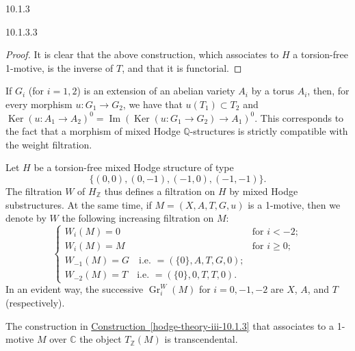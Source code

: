 \begin{construction}{10.1.3}
\begin{lemma}{10.1.3.3}
\begin{proof}
  \par{}It is clear that the above construction, which associates to \(H\) a torsion-free 1-motive, is the inverse of \(T\), and that it is functorial.\end{proof}\end{lemma}\par{}If \(G_i\) (for \(i=1,2\)) is an extension of an abelian variety \(A_i\) by a torus \(A_i\), then, for every morphism \(u\colon  G_1\to  G_2\), we have that \(u(T_1)\subset  T_2\) and \(\operatorname {Ker}(u\colon  A_1\to  A_2)^0=\operatorname {Im}(\operatorname {Ker}(u\colon  G_1\to  G_2)\to  A_1)^0\).
    This corresponds to the fact that a morphism of mixed Hodge \(\mathbb {Q}\)-structures is strictly compatible with the weight filtration.\end{construction}\label{hodge-theory-iii-10.1.4}\par{}Let \(H\) be a torsion-free mixed Hodge structure of type
    \[       \big \{(0,0),(0,-1),(-1,0),(-1,-1)\big \}.     \]
    The filtration \(W\) of \(H_\mathbb {Z}\) thus defines a filtration on \(H\) by mixed Hodge substructures.
    At the same time, if \(M=(X,A,T,G,u)\) is a 1-motive, then we denote by \(W\) the following increasing filtration on \(M\):
    \[       \begin {cases}         W_i(M) = 0         & \text {for }i< -2;       \\W_i(M) = M         & \text {for }i\geqslant 0;       \\W_{-1}(M) = G         \quad \text {i.e. } = (\{0\},A,T,G,0);       \\W_{-2}(M) = T         \quad \text {i.e. } = (\{0\},0,T,T,0).       \end {cases}     \]
    In an evident way, the successive \(\operatorname {Gr}_i^W(M)\) for \(i=0,-1,-2\) are \(X\), \(A\), and \(T\) (respectively).\label{hodge-theory-iii-10.1.5}\par{}The construction in \hyperref[hodge-theory-iii-10.1.3]{Construction~\ref*{hodge-theory-iii-10.1.3}} that associates to a 1-motive \(M\) over \(\mathbb {C}\) the object \(T_\mathbb {Z}(M)\) is transcendental.
